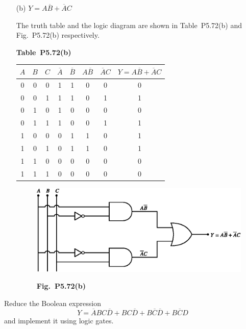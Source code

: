 \begin{solution}
\begin{itemize}
\item[(b)] $Y=A\overline{B}+\overline{A}C$

The truth table and the logic diagram are shown in Table~P5.72(b) and Fig.~P5.72(b) respectively.
\begin{table}[H]
\centering
{\bf Table~P5.72(b)}
\medskip

\renewcommand{\arraystretch}{1.4}
\begin{tabular}{|ccc|c|c|c|c|c|}
\hline
\boldmath$A$ & \boldmath$B$ & \boldmath$C$ & \boldmath$\overline{A}$ & \boldmath$\overline{B}$ & \boldmath$A\overline{B}$ & \boldmath$\overline{A}C$ & \boldmath$Y=A\overline{B}+\overline{A}C$\\
\hline
0 & 0 & 0 & 1 & 1 & 0 & 0 & 0\\
0 & 0 & 1 & 1 & 1 & 0 & 1 & 1\\
0 & 1 & 0 & 1 & 0 & 0 & 0 & 0\\
0 & 1 & 1 & 1 & 0 & 0 & 1 & 1\\
1 & 0 & 0 & 0 & 1 & 1 & 0 & 1\\
1 & 0 & 1 & 0 & 1 & 1 & 0 & 1\\
1 & 1 & 0 & 0 & 0 & 0 & 0 & 0\\
1 & 1 & 1 & 0 & 0 & 0 & 0 & 0\\
\hline
\end{tabular}
\end{table}
\begin{figure}[H]
\centering
\includegraphics{chap5/figP5.69b.eps}

\smallskip
{\bf Fig.~P5.72(b)}
\end{figure}
\end{itemize}
\end{solution}

\begin{problem}\label{prob5.73}
Reduce the Boolean expression
$$
Y=\overline{A}BC\overline{D}+BC\overline{D}+B\overline{C}\overline{D}+B\overline{C}D
$$
and implement it using logic gates.
\end{problem}

